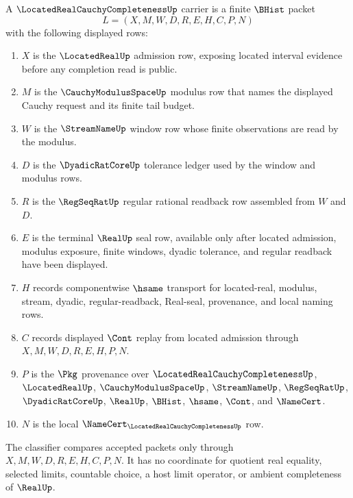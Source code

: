 \begin{definition}
\label{def:located-real-cauchy-completeness-carrier}
A $\LocatedRealCauchyCompletenessUp$ carrier is a finite $\BHist$ packet
$$
L=(X,M,W,D,R,E,H,C,P,N)
$$
with the following displayed rows:
\begin{enumerate}
\item $X$ is the $\LocatedRealUp$ admission row, exposing located interval evidence before any completion read is public.
\item $M$ is the $\CauchyModulusSpaceUp$ modulus row that names the displayed Cauchy request and its finite tail budget.
\item $W$ is the $\StreamNameUp$ window row whose finite observations are read by the modulus.
\item $D$ is the $\DyadicRatCoreUp$ tolerance ledger used by the window and modulus rows.
\item $R$ is the $\RegSeqRatUp$ regular rational readback row assembled from $W$ and $D$.
\item $E$ is the terminal $\RealUp$ seal row, available only after located admission, modulus exposure, finite windows, dyadic tolerance, and regular readback have been displayed.
\item $H$ records componentwise $\hsame$ transport for located-real, modulus, stream, dyadic, regular-readback, Real-seal, provenance, and local naming rows.
\item $C$ records displayed $\Cont$ replay from located admission through $X,M,W,D,R,E,H,P,N$.
\item $P$ is the $\Pkg$ provenance over $\LocatedRealCauchyCompletenessUp$, $\LocatedRealUp$, $\CauchyModulusSpaceUp$, $\StreamNameUp$, $\RegSeqRatUp$, $\DyadicRatCoreUp$, $\RealUp$, $\BHist$, $\hsame$, $\Cont$, and $\NameCert$.
\item $N$ is the local $\NameCert_{\LocatedRealCauchyCompletenessUp}$ row.
\end{enumerate}
The classifier compares accepted packets only through $X,M,W,D,R,E,H,C,P,N$. It has no coordinate for quotient real equality, selected limits, countable choice, a host limit operator, or ambient completeness of $\RealUp$.
\end{definition}


